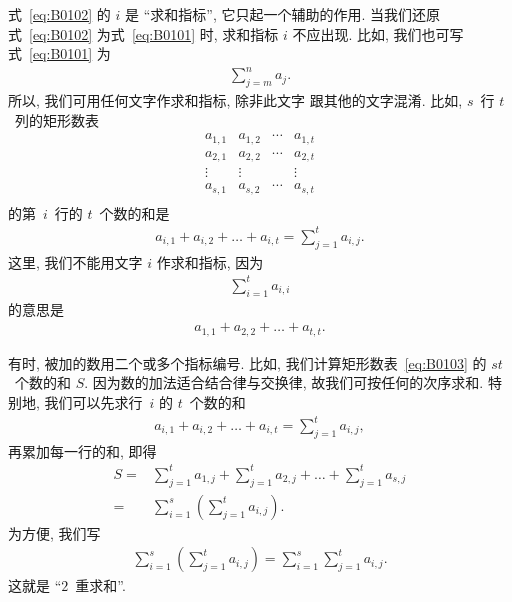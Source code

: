 式~\eqref{eq:B0102} 的 \(i\) 是 ``求和指标'',
它只起一个辅助的作用.
当我们还原式~\eqref{eq:B0102}
为式~\eqref{eq:B0101} 时,
求和指标 \(i\) 不应出现.
比如, 我们也可写式~\eqref{eq:B0101} 为
\begin{align*}
    \sum_{j = m}^{n} {a_j}.
\end{align*}
所以, 我们可用任何文字作求和指标, 除非此文字%
跟其他的文字混淆.
比如, \(s\)~行 \(t\)~列的矩形数表
\begin{equation}
    \begin{matrix}
        a_{1,1} & a_{1,2} & \cdots & a_{1,t} \\
        a_{2,1} & a_{2,2} & \cdots & a_{2,t} \\
        \vdots  & \vdots  & {}     & \vdots  \\
        a_{s,1} & a_{s,2} & \cdots & a_{s,t} \\
    \end{matrix}
    \label{eq:B0103}
\end{equation}
的第~\(i\)~行的 \(t\)~个数的和是
\begin{align*}
    a_{i,1} + a_{i,2} + \dots + a_{i,t}
    = \sum_{j = 1}^{t} {a_{i,j}}.
\end{align*}
这里, 我们不能用文字 \(i\) 作求和指标,
因为
\begin{align*}
    \sum_{i = 1}^{t} {a_{i,i}}
\end{align*}
的意思是
\begin{align*}
    a_{1,1} + a_{2,2} + \dots + a_{t,t}.
\end{align*}

有时, 被加的数用二个或多个指标编号.
比如, 我们计算矩形数表~\eqref{eq:B0103} 的 \(st\)~个数的和 \(S\).
因为数的加法适合结合律与交换律,
故我们可按任何的次序求和.
特别地, 我们可以先求行~\(i\) 的 \(t\)~个数的和
\begin{align*}
    a_{i,1} + a_{i,2} + \dots + a_{i,t}
    = \sum_{j = 1}^{t} {a_{i,j}},
\end{align*}
再累加每一行的和, 即得
\begin{align*}
    S
    = {} & \sum_{j = 1}^{t} {a_{1,j}}
    + \sum_{j = 1}^{t} {a_{2,j}}
    + \dots
    + \sum_{j = 1}^{t} {a_{s,j}}
    \\
    = {} &
    \sum_{i = 1}^{s}
    {\left( \sum_{j = 1}^{t} a_{i,j} \right)}.
\end{align*}
为方便, 我们写
\begin{align*}
    \sum_{i = 1}^{s}
    {\left( \sum_{j = 1}^{t} a_{i,j} \right)}
    = \sum_{i = 1}^{s}
    {\sum_{j = 1}^{t} {a_{i,j}}}.
\end{align*}
这就是 ``\(2\)~重求和''.

